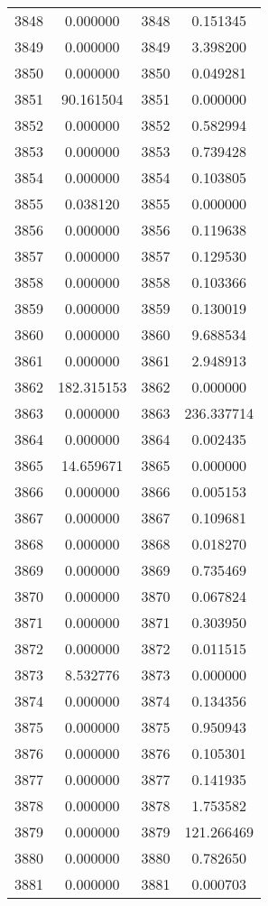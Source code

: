 \documentclass[12pt]{article}
\begin{document}
\begin{longtable}{@{}cccc@{}}
3848 & 0.000000 & 3848 & 0.151345 \\
3849 & 0.000000 & 3849 & 3.398200 \\
3850 & 0.000000 & 3850 & 0.049281 \\
3851 & 90.161504 & 3851 & 0.000000 \\
3852 & 0.000000 & 3852 & 0.582994 \\
3853 & 0.000000 & 3853 & 0.739428 \\
3854 & 0.000000 & 3854 & 0.103805 \\
3855 & 0.038120 & 3855 & 0.000000 \\
3856 & 0.000000 & 3856 & 0.119638 \\
3857 & 0.000000 & 3857 & 0.129530 \\
3858 & 0.000000 & 3858 & 0.103366 \\
3859 & 0.000000 & 3859 & 0.130019 \\
3860 & 0.000000 & 3860 & 9.688534 \\
3861 & 0.000000 & 3861 & 2.948913 \\
3862 & 182.315153 & 3862 & 0.000000 \\
3863 & 0.000000 & 3863 & 236.337714 \\
3864 & 0.000000 & 3864 & 0.002435 \\
3865 & 14.659671 & 3865 & 0.000000 \\
3866 & 0.000000 & 3866 & 0.005153 \\
3867 & 0.000000 & 3867 & 0.109681 \\
3868 & 0.000000 & 3868 & 0.018270 \\
3869 & 0.000000 & 3869 & 0.735469 \\
3870 & 0.000000 & 3870 & 0.067824 \\
3871 & 0.000000 & 3871 & 0.303950 \\
3872 & 0.000000 & 3872 & 0.011515 \\
3873 & 8.532776 & 3873 & 0.000000 \\
3874 & 0.000000 & 3874 & 0.134356 \\
3875 & 0.000000 & 3875 & 0.950943 \\
3876 & 0.000000 & 3876 & 0.105301 \\
3877 & 0.000000 & 3877 & 0.141935 \\
3878 & 0.000000 & 3878 & 1.753582 \\
3879 & 0.000000 & 3879 & 121.266469 \\
3880 & 0.000000 & 3880 & 0.782650 \\
3881 & 0.000000 & 3881 & 0.000703 \\

\end{longtable}
\end{document}
